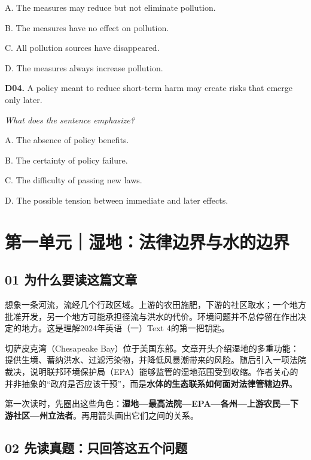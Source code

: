 \documentclass[a4paper,11pt,openany]{report}
\begin{document}
A. The measures may reduce but not eliminate pollution.

B. The measures have no effect on pollution.

C. All pollution sources have disappeared.

D. The measures always increase pollution.

\textbf{D04.} A policy meant to reduce short-term harm may create risks that emerge only later.

\emph{What does the sentence emphasize?}

A. The absence of policy benefits.

B. The certainty of policy failure.

C. The difficulty of passing new laws.

D. The possible tension between immediate and later effects.

\chapter{第一单元｜湿地：法律边界与水的边界}\label{ux7b2cux4e00ux5355ux5143ux6e7fux5730ux6cd5ux5f8bux8fb9ux754cux4e0eux6c34ux7684ux8fb9ux754c}

\section{01 为什么要读这篇文章}\label{ux4e3aux4ec0ux4e48ux8981ux8bfbux8fd9ux7bc7ux6587ux7ae0}

想象一条河流，流经几个行政区域。上游的农田施肥，下游的社区取水；一个地方批准开发，另一个地方可能承担径流与洪水的代价。环境问题并不总停留在作出决定的地方。这是理解2024年英语（一）Text 4的第一把钥匙。

切萨皮克湾（Chesapeake Bay）位于美国东部。文章开头介绍湿地的多重功能：提供生境、蓄纳洪水、过滤污染物，并降低风暴潮带来的风险。随后引入一项法院裁决，说明联邦环境保护局（EPA）能够监管的湿地范围受到收缩。作者关心的并非抽象的``政府是否应该干预''，而是\textbf{水体的生态联系如何面对法律管辖边界}。

第一次读时，先圈出这些角色：\textbf{湿地---最高法院---EPA---各州---上游农民---下游社区---州立法者}。再用箭头画出它们之间的关系。

\section{02 先读真题：只回答这五个问题}\label{ux5148ux8bfbux771fux9898ux53eaux56deux7b54ux8fd9ux4e94ux4e2aux95eeux9898}
\end{document}
